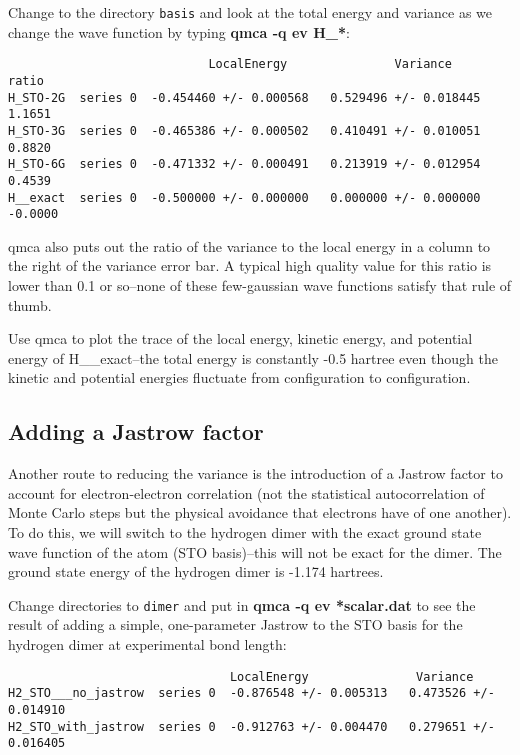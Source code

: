 Change to the directory \texttt{basis} and look at the total energy and
variance as we change the wave function by typing \textbf{qmca -q ev H\_*}:

\begin{shaded}
\begin{verbatim}
                            LocalEnergy               Variance        ratio 
H_STO-2G  series 0  -0.454460 +/- 0.000568   0.529496 +/- 0.018445   1.1651 
H_STO-3G  series 0  -0.465386 +/- 0.000502   0.410491 +/- 0.010051   0.8820 
H_STO-6G  series 0  -0.471332 +/- 0.000491   0.213919 +/- 0.012954   0.4539 
H__exact  series 0  -0.500000 +/- 0.000000   0.000000 +/- 0.000000   -0.0000 
\end{verbatim}
\end{shaded}

qmca also puts out the ratio of the variance to the local energy in a column to
the right of the variance error bar.  A typical high quality value for this
ratio is lower than 0.1 or so--none of these few-gaussian wave functions
satisfy that rule of thumb.

Use qmca to plot the trace of the local energy, kinetic energy, and potential
energy of H\_\_exact--the total energy is constantly -0.5 hartree even though
the kinetic and potential energies fluctuate from configuration to
configuration.

\subsection{Adding a Jastrow factor}

Another route to reducing the variance is the introduction of a Jastrow factor to 
account for electron-electron correlation (not the statistical autocorrelation
of Monte Carlo steps but the physical avoidance that electrons have of one another).
To do this, we will switch to the hydrogen dimer with the exact ground state
wave function of the atom (STO basis)--this will not be exact for the dimer.
The ground state energy of the hydrogen dimer is -1.174 hartrees.

Change directories to \texttt{dimer} and put in \textbf{qmca -q ev *scalar.dat}
to see the result of adding a simple, one-parameter Jastrow to the STO basis
for the hydrogen dimer at experimental bond length:

\begin{shaded}
\begin{verbatim}
                               LocalEnergy               Variance           
H2_STO___no_jastrow  series 0  -0.876548 +/- 0.005313   0.473526 +/- 0.014910
H2_STO_with_jastrow  series 0  -0.912763 +/- 0.004470   0.279651 +/- 0.016405
\end{verbatim}
\end{shaded}

